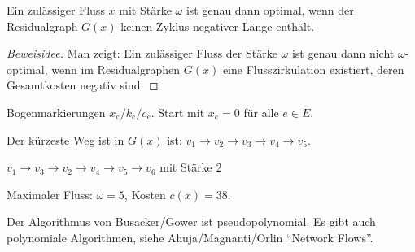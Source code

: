 
\begin{aus} %
  Ein zulässiger Fluss $x$ mit Stärke $\omega$ ist genau dann optimal, wenn der
  Residualgraph $G(x)$ keinen Zyklus negativer Länge enthält.
\end{aus}

\begin{proof}[Beweisidee]
  Man zeigt: Ein zulässiger Fluss der Stärke $\omega$ ist genau dann nicht
  $\omega$-optimal, wenn im Residualgraphen $G(x)$ eine Flusszirkulation
  existiert, deren Gesamtkosten negativ sind.
\end{proof}

\begin{exmp} %
  Bogenmarkierungen $x_e / k_e / c_e$.  Start mit $x_e = 0$ für alle $e \in E$.


  Der kürzeste Weg ist in $G(x)$ ist: $v_1 \to v_2 \to v_3 \to v_4 \to v_5$.


  $v_1 \to v_3 \to v_2 \to v_4 \to v_5 \to v_6$ mit Stärke 2


  Maximaler Fluss: $\omega = 5$, Kosten $c(x) = 38$.
\end{exmp}

\begin{rmrk*}
  Der Algorithmus von Busacker/Gower ist pseudopolynomial. Es gibt auch
  polynomiale Algorithmen, siehe Ahuja/Magnanti/Orlin ``Network Flows''.
\end{rmrk*}